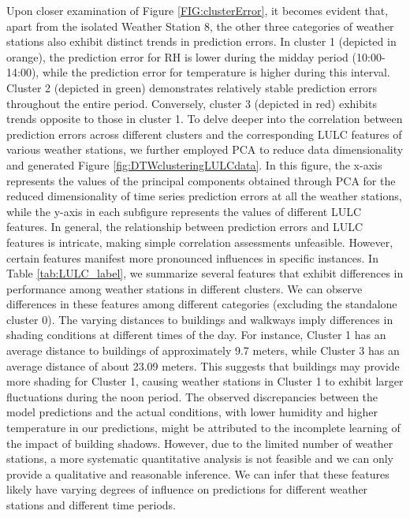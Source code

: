 \documentclass[a4paper,fleqn]{cas-sc}
\begin{document}
Upon closer examination of Figure \ref{FIG:clusterError}, it becomes evident that, apart from the isolated Weather Station 8, the other three categories of weather stations also exhibit distinct trends in prediction errors. In cluster 1 (depicted in orange), the prediction error for RH is lower during the midday period (10:00-14:00), while the prediction error for temperature is higher during this interval. Cluster 2 (depicted in green) demonstrates relatively stable prediction errors throughout the entire period. Conversely, cluster 3 (depicted in red) exhibits trends opposite to those in cluster 1. To delve deeper into the correlation between prediction errors across different clusters and the corresponding LULC features of various weather stations, we further employed PCA to reduce data dimensionality and generated Figure \ref{fig:DTWclusteringLULCdata}. In this figure, the x-axis represents the values of the principal components obtained through PCA for the reduced dimensionality of time series prediction errors at all the weather stations, while the y-axis in each subfigure represents the values of different LULC features. In general, the relationship between prediction errors and LULC features is intricate, making simple correlation assessments unfeasible. However, certain features manifest more pronounced influences in specific instances. In Table \ref{tab:LULC_label}, we summarize several features that exhibit differences in performance among weather stations in different clusters. We can observe differences in these features among different categories (excluding the standalone cluster 0). The varying distances to buildings and walkways imply differences in shading conditions at different times of the day. For instance, Cluster 1 has an average distance to buildings of approximately 9.7 meters, while Cluster 3 has an average distance of about 23.09 meters. This suggests that buildings may provide more shading for Cluster 1, causing weather stations in Cluster 1 to exhibit larger fluctuations during the noon period. The observed discrepancies between the model predictions and the actual conditions, with lower humidity and higher temperature in our predictions, might be attributed to the incomplete learning of the impact of building shadows. However, due to the limited number of weather stations, a more systematic quantitative analysis is not feasible and we can only provide a qualitative and reasonable inference. We can infer that these features likely have varying degrees of influence on predictions for different weather stations and different time periods.
\end{document}
